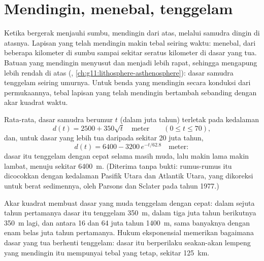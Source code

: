 \section{Mendingin, menebal, tenggelam}

Ketika bergerak menjauhi sumbu,  mendingin dari atas, melalui samudra
dingin di atasnya. Lapisan yang telah mendingin makin tebal seiring waktu:
 menebal, dari beberapa kilometer di sumbu sampai sekitar seratus
kilometer di dasar yang tua. Batuan yang mendingin menyusut dan menjadi lebih
rapat, sehingga  mengapung lebih rendah di atas  (,
\cref{ch:g11:lithosphere-asthenosphere}): dasar samudra tenggelam seiring
umurnya. Untuk benda yang mendingin secara konduksi dari permukaannya, tebal
lapisan yang telah mendingin bertambah sebanding dengan akar kuadrat waktu.

\begin{proposition}\label{prop:g11:ocean-ridges:depth-age}
Rata-rata, dasar samudra berumur $t$ (dalam juta tahun) terletak pada kedalaman
\[
  d(t) = 2500 + 350\sqrt{t} \quad \text{meter} \qquad (0 \le t \le 70),
\]
dan, untuk dasar yang lebih tua daripada sekitar 20 juta tahun,
\[
  d(t) = 6400 - 3200\,e^{-t/62.8} \quad \text{meter}:
\]
dasar itu tenggelam dengan cepat selama masih muda, lalu makin lama makin lambat,
menuju sekitar \qty{6400}{m}. (Diterima tanpa bukti: rumus-rumus itu dicocokkan
dengan kedalaman Pasifik Utara dan Atlantik Utara, yang dikoreksi untuk berat
sedimennya, oleh Parsons dan Sclater pada tahun 1977.)
\end{proposition}

Akar kuadrat membuat dasar yang muda tenggelam dengan cepat: dalam sejuta tahun
pertamanya dasar itu tenggelam \qty{350}{m}, dalam tiga juta tahun berikutnya
\qty{350}{m} lagi, dan antara 16 dan 64 juta tahun \qty{1400}{m}, sama banyaknya
dengan enam belas juta tahun pertamanya. Hukum eksponensial memerikan bagaimana
dasar yang tua berhenti tenggelam: dasar itu berperilaku seakan-akan lempeng yang
mendingin itu mempunyai tebal yang tetap, sekitar \qty{125}{km}.

